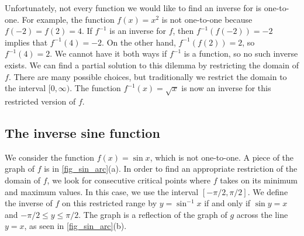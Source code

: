 Unfortunately, not every function we would like to find an inverse for is one-to-one. For example, the function $f(x)=x^2$ is not one-to-one because $f(-2)=f(2)=4$. If $f^{-1}$ is an inverse for $f$, then $f^{-1}(f(-2))=-2$ implies that $f^{-1}(4)=-2$. On the other hand, $f^{-1}(f(2))=2$, so $f^{-1}(4)=2$. We cannot have it both ways if $f^{-1}$ is a function, so no such inverse exists. We can find a partial solution to this dilemma by restricting the domain of $f$. There are many possible choices, but traditionally we restrict the domain to the interval $[0,\infty)$. The function $f^{-1}(x)=\sqrt x$ is now an inverse for this restricted version of $f$.


\subsection{The inverse sine function}

We consider the function $f(x)=\sin x$, which is not one-to-one. A piece of the graph of $f$ is in \autoref{fig_sin_arc}(a). In order to find an appropriate restriction of the domain of $f$, we look for consecutive critical points where $f$ takes on its minimum and maximum values. In this case, we use the interval $[-\pi/2,\pi/2]$. We define the inverse of $f$ on this restricted range by $y=\sin^{-1}x$ if and only if $\sin y=x$ and $-\pi/2\leq y\leq \pi/2$. The graph is a reflection of the graph of $g$ across the line $y=x$, as seen in \autoref{fig_sin_arc}(b).

